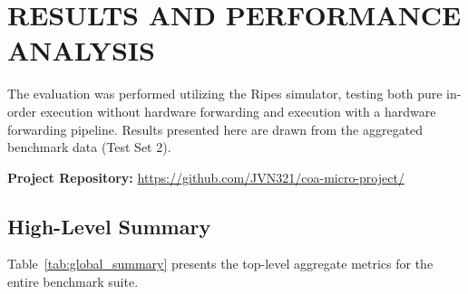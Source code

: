 \documentclass[11pt]{report}
\begin{document}
\section{RESULTS AND PERFORMANCE ANALYSIS}

The evaluation was performed utilizing the Ripes simulator, testing both pure in-order execution without hardware forwarding and execution with a hardware forwarding pipeline. Results presented here are drawn from the aggregated benchmark data (Test Set 2).

\noindent
\textbf{Project Repository:} \url{https://github.com/JVN321/coa-micro-project/}

\subsection{High-Level Summary}

Table~\ref{tab:global_summary} presents the top-level aggregate metrics for the entire benchmark suite.
\end{document}
